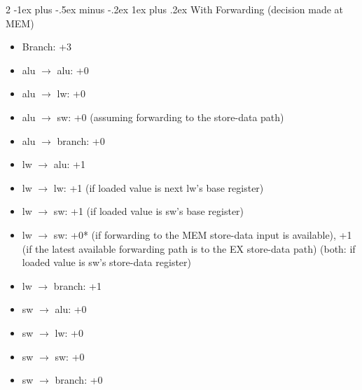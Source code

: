 \documentclass[10pt, portrait]{article}
\makeatletter
\renewcommand{\subsection}{\@startsection{subsection}{3}{0mm}%
                                {-1ex plus -.5ex minus -.2ex}%
                                {1ex plus .2ex}%
                                {\normalfont\small\bfseries}}%
\makeatother
\begin{document}
\begin{multicols*}{2}
\subsection{With Forwarding (decision made at MEM)}
\begin{itemize}
    \item Branch: +3
    \item alu $\rightarrow$ alu: +0
    \item alu $\rightarrow$ lw: +0
    \item alu $\rightarrow$ sw: +0 (assuming forwarding to the store-data path)
    \item alu $\rightarrow$ branch: +0
    \item lw $\rightarrow$ alu: +1
    \item lw $\rightarrow$ lw: +1 (if loaded value is next lw's base register)
    \item lw $\rightarrow$ sw: +1 (if loaded value is sw's base register)
    \item lw $\rightarrow$ sw: +0* (if forwarding to the MEM store-data input is available), +1 (if the latest available forwarding path is to the EX store-data path) (both: if loaded value is sw's store-data register)
    \item lw $\rightarrow$ branch: +1
    \item sw $\rightarrow$ alu: +0
    \item sw $\rightarrow$ lw: +0
    \item sw $\rightarrow$ sw: +0
    \item sw $\rightarrow$ branch: +0
\end{itemize}


\end{multicols*}
\end{document}

